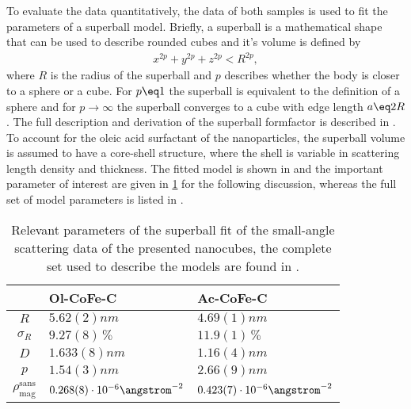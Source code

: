 \documentclass[\main/dresen_thesis.tex]{subfiles}
\begin{document}
    To evaluate the data quantitatively, the data of both samples is used to fit the parameters of a superball model.
    Briefly, a superball is a mathematical shape that can be used to describe rounded cubes and it's volume is defined by
    \begin{align}
      x^{2p} + y^{2p} + z^{2p} < R^{2p},
    \end{align}
    where $R$ is the radius of the superball and $p$ describes whether the body is closer to a sphere or a cube.
    For $p\eq 1$ the superball is equivalent to the definition of a sphere and for $p \rightarrow \infty$ the superball converges to a cube with edge length $a \eq 2R$.
    The full description and derivation of the superball formfactor is described in .
    To account for the oleic acid surfactant of the nanoparticles, the superball volume is assumed to have a core-shell structure, where the shell is variable in scattering length density and thickness.
    The fitted model is shown in  and the important parameter of interest are given in \ref{tab:monolayers:nanoparticle:sas} for the following discussion, whereas the full set of model parameters is listed in .
    \begin{table}[ht]
      \centering
      \caption{\label{tab:monolayers:nanoparticle:sas}Relevant parameters of the superball fit of the small-angle scattering data of the presented nanocubes, the complete set used to describe the models are found in .}
      \begin{tabular}{ c | l | l }
          & Ol-CoFe-C & Ac-CoFe-C \\
        \hline
        $R$
          & $5.62(2) \unit{nm}$
          & $4.69(1) \unit{nm}$\\
        $\sigma_R$
          & $9.27(8) \,\%$
          & $11.9(1) \,\%$\\
        $D$
          & $1.633(8) \unit{nm}$
          & $1.16(4) \unit{nm}$\\
        $p$
          & $1.54(3) \unit{nm}$
          & $2.66(9) \unit{nm}$\\
        $\rho_\mathrm{mag}^\mathrm{sans}$
          & $0.268(8) \cdot 10^{-6} \angstrom^{-2}$
          & $0.423(7) \cdot 10^{-6} \angstrom^{-2}$\\
        \hline
      \end{tabular}
    \end{table}
\end{document}
